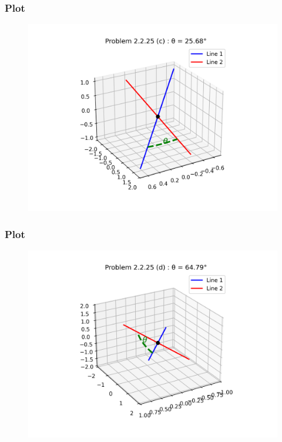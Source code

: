 \documentclass{beamer}
\theoremstyle{remark}
\numberwithin{equation}{section}
\begin{document}
\begin{frame}
    \frametitle{Plot}
\begin{figure}[H]
    \centering
    \includegraphics[width=0.9\columnwidth]{figs/figure_c.png}
    \caption{}
    \label{fig:placeholder}
\end{figure}
\end{frame}

\begin{frame}
    \frametitle{Plot}
\begin{figure}[H]
    \centering
    \includegraphics[width=0.9\columnwidth]{figs/figure_d.png}
    \caption{}
    \label{fig:placeholder}
\end{figure}
\end{frame}
\end{document}
